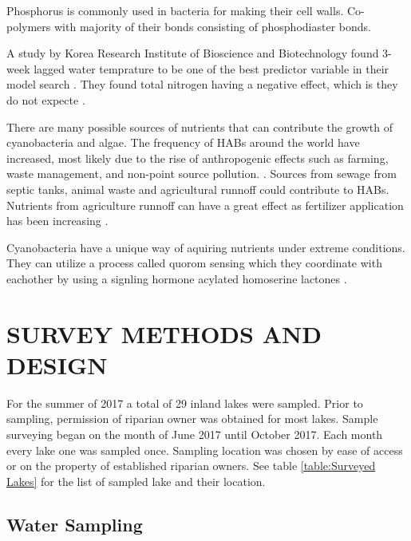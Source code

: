 \documentclass{ou-thesis}
\begin{document}
Phosphorus is commonly used in bacteria for making their cell walls. Co-polymers with majority of their bonds consisting of phosphodiaster bonds.


A study by Korea Research Institute of Bioscience and Biotechnology found 3-week lagged water temprature to be one of the best predictor variable in their model search \cite{ahn_evaluation_2011}. They found total nitrogen having a negative effect, which is they do not expecte \cite{ahn_evaluation_2011}.


There are many possible sources of nutrients that can contribute the growth of cyanobacteria and algae. The frequency of HABs around the world have increased, most likely due to the rise of anthropogenic effects such as farming, waste management, and non-point source pollution. \cite{wilhelm_relationships_2011}.
Sources from sewage from septic tanks, animal waste and agricultural runnoff  could contribute to HABs. Nutrients from agriculture runnoff can have a great effect as fertilizer application has been increasing \cite{anderson_harmful_2002}.

Cyanobacteria have a unique way of aquiring nutrients under extreme conditions. They can utilize a process called quorom sensing which they coordinate with eachother by using a signling hormone acylated homoserine lactones \cite{van_mooy_quorum_2012}.















\chapter{SURVEY METHODS AND DESIGN}

For the summer of 2017 a total of 29 inland lakes were sampled.  Prior to sampling, permission of riparian owner was obtained for most lakes. Sample surveying began on the month of June 2017 until October 2017. Each month every lake one was sampled once. Sampling location was chosen by ease of access or on the property of established riparian owners. See table \ref{table:Surveyed Lakes} for the list of sampled lake and their location.

\section{Water Sampling}
\end{document}
